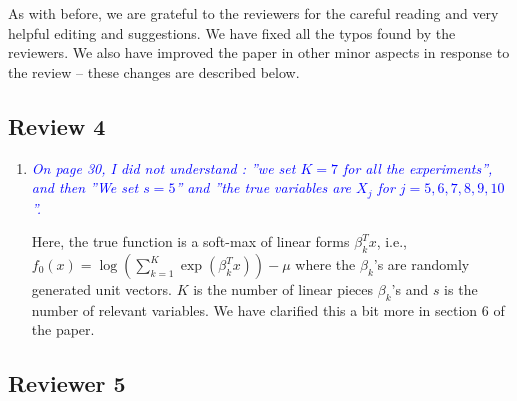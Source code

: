 \documentclass[pdftex,12pt]{article}
\def\rc#1{{\it\textcolor{blue}{#1}}\smallskip}
\begin{document}
\vspace*{5pt}

As with before, we are grateful to the reviewers for the careful reading and very helpful editing and suggestions. We have fixed all the typos found by the reviewers. We also have improved the paper in other minor aspects in response to the review -- these changes are described below. 

\subsection*{Review 4}


\begin{enumerate}
\item \rc{On page 30, I did not understand : ”we set $K = 7$ for all the experiments”, and then ”We set $s = 5$” and ”the true variables are $X_j$ for $j = 5,6,7,8,9,10$”.}

Here, the true function is a soft-max of linear forms $\beta_k^T x$, i.e., 
$f_0(x) = \log \left( \sum_{k=1}^K \exp( \beta_k^T x) \right) - \mu$ where the $\beta_k$'s are randomly generated unit vectors. $K$ is the number of linear pieces $\beta_k$'s and $s$ is the number of relevant variables. We have clarified this a bit more in section 6 of the paper.  
\end{enumerate}


\subsection*{Reviewer 5}
\end{document}
